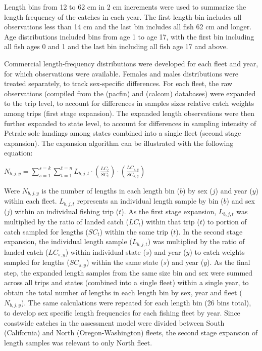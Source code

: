 \documentclass[
]{scrartcl}
\begin{document}
Length bins from 12 to 62 cm in 2 cm increments were used to summarize
the length frequency of the catches in each year. The first length bin
includes all observations less than 14 cm and the last bin includes all
fish 62 cm and longer. Age distributions included bins from age 1 to age
17, with the first bin including all fish ages 0 and 1 and the last bin
including all fish age 17 and above.

Commercial length-frequency distributions were developed for each fleet
and year, for which observations were available. Females and males
distributions were treated separately, to track sex-specific
differences. For each fleet, the raw observations (compiled from the
(pacfin) and (calcom) databases) were expanded to the trip level, to
account for differences in samples sizes relative catch weights among
trips (first stage expansion). The expanded length observations were
then further expanded to state level, to account for differences in
sampling intensity of Petrale sole landings among states combined into a
single fleet (second stage expansion). The expansion algorithm can be
illustrated with the following equation:

\begin{centering}

$N_{b,j,y} = \displaystyle\sum_{s=1}^{s=k}\displaystyle\sum_{t=1}^{t=n}L_{b,j,t} \cdot
\left(\frac{LC_t}{SC_t}\right) \cdot \left(\frac{LC_{s,y}}{SC_{s,y}}\right)$

\end{centering}

Were \(N_{b,j,y}\) is the number of lengths in each length bin (\(b\))
by sex (\(j\)) and year (\(y\)) within each fleet. \(L_{b,j,t}\)
represents an individual length sample by bin (\(b\)) and sex (\(j\))
within an individual fishing trip (\(t\)). As the first stage expansion,
\(L_{b,j,t}\) was multiplied by the ratio of landed catch (\(LC_t\))
within that trip (\(t\)) to portion of catch sampled for lengths
(\(SC_t\)) within the same trip (\(t\)). In the second stage expansion,
the individual length sample (\(L_{b,j,t}\)) was multiplied by the ratio
of landed catch (\(LC_{s,y}\)) within individual state (\(s\)) and year
(\(y\)) to catch weights sampled for lengths (\(SC_{s,y}\)) within the
same state (\(s\)) and year (\(y\)). As the final step, the expanded
length samples from the same size bin and sex were summed across all
trips and states (combined into a single fleet) within a single year, to
obtain the total number of lengths in each length bin by sex, year and
fleet (\(N_{b,j,y}\)). The same calculations were repeated for each
length bin (26 bins total), to develop sex specific length frequencies
for each fishing fleet by year. Since coastwide catches in the
assessment model were divided between South (California) and North
(Oregon-Washington) fleets, the second stage expansion of length samples
was relevant to only North fleet.
\end{document}
